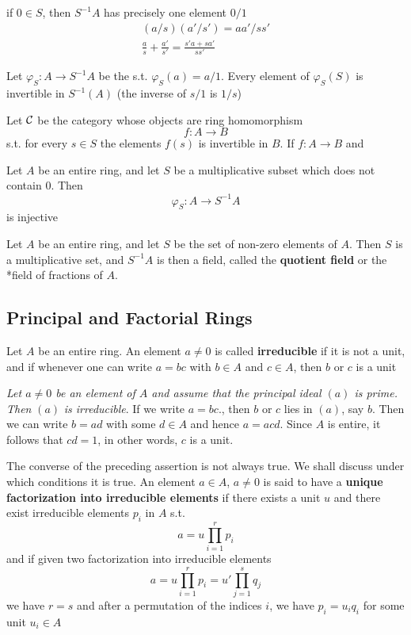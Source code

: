\documentclass[11pt]{article}
\begin{document}
if \(0\in  S\), then \(S^{-1}A\) has precisely one element \(0/1\)
\begin{gather*}
(a/s)(a'/s')=aa'/ss'\\
\frac{a}{s}+\frac{a'}{s'}=\frac{s'a+sa'}{ss'}
\end{gather*}

Let \(\varphi_S:A\to S^{-1}A\) be the s.t. \(\varphi_S(a)=a/1\). Every element of \(\varphi_S(S)\) is invertible
in \(S^{-1}(A)\) (the inverse of \(s/1\) is \(1/s\))

Let \(\mathcal{C}\) be the category whose objects are ring homomorphism
\begin{equation*}
f:A\to B
\end{equation*}
s.t. for every \(s\in S\) the elements \(f(s)\) is invertible in \(B\). If \(f:A\to B\) and

\begin{proposition}[]
Let \(A\) be an entire ring, and let \(S\) be a multiplicative subset which does not contain 0.
Then
\begin{equation*}
\varphi_S:A\to S^{-1}A
\end{equation*}
is injective
\end{proposition}

Let \(A\) be an entire ring, and let \(S\) be the set of non-zero elements of \(A\). Then \(S\)
is a multiplicative set, and \(S^{-1}A\) is then a field, called the \textbf{quotient field} or the *field
of fractions of \(A\).

\subsection{Principal and Factorial Rings}
\label{sec:orgba5123e}
Let \(A\) be an entire ring. An element \(a\neq 0\) is called \textbf{irreducible} if it is not a unit, and
if whenever one can write \(a=bc\) with \(b\in A\) and \(c\in A\), then \(b\) or \(c\) is a unit

\emph{Let \(a\neq 0\) be an element of \(A\) and assume that the principal ideal \((a)\) is prime. Then}
\((a)\) \emph{is irreducible}. If we write \(a=bc\)., then \(b\) or \(c\) lies in \((a)\), say \(b\).
Then we can write \(b=ad\) with some \(d\in A\) and hence \(a=acd\). Since \(A\) is entire, it
follows that \(cd=1\), in other words, \(c\) is a unit.

The converse of the preceding assertion is not always true. We shall discuss under which
conditions it is true. An element \(a\in A\), \(a\neq 0\) is said to have a
\textbf{unique factorization into irreducible elements} if there exists a unit \(u\) and there exist
irreducible elements \(p_i\) in \(A\) s.t.
\begin{equation*}
a=u\prod_{i=1}^rp_i
\end{equation*}
and if given two factorization into irreducible elements
\begin{equation*}
a=u\prod_{i=1}^rp_i=u'\prod_{j=1}^sq_j
\end{equation*}
we have \(r=s\) and after a permutation of the indices \(i\), we have \(p_i=u_iq_i\) for some
unit \(u_i\in A\)
\end{document}
